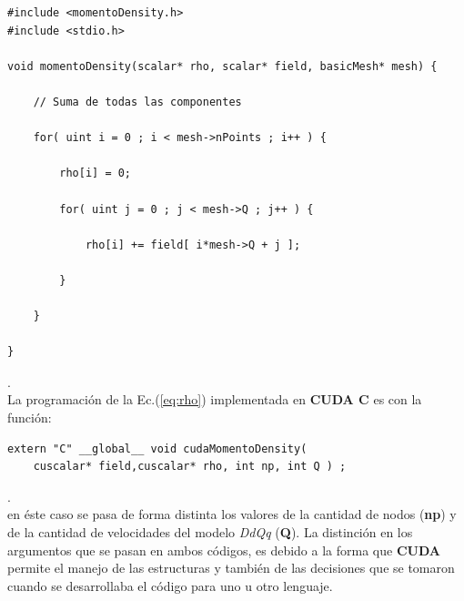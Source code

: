{\footnotesize
	\begin{frame}{}
		\begin{lstlisting}[frame=single]
#include <momentoDensity.h>
#include <stdio.h>

void momentoDensity(scalar* rho, scalar* field, basicMesh* mesh) {
	
	// Suma de todas las componentes
	
	for( uint i = 0 ; i < mesh->nPoints ; i++ ) {
		
		rho[i] = 0;	    
		
		for( uint j = 0 ; j < mesh->Q ; j++ ) {
		
			rho[i] += field[ i*mesh->Q + j ];
		
		}	
			
	}
	
}
		\end{lstlisting}
		
	\end{frame}
}.
\\

La programación de la Ec.(\ref{eq:rho}) implementada en \textbf{CUDA C} es con la función:

{\footnotesize
	\begin{frame}{}
		\begin{lstlisting}
extern "C" __global__ void cudaMomentoDensity(
	cuscalar* field,cuscalar* rho, int np, int Q ) ; 
		\end{lstlisting}
		
	\end{frame}
}.
\\
en éste caso se pasa de forma distinta los valores de la cantidad de nodos (\textbf{np}) y de la cantidad de velocidades del modelo \textit{DdQq} (\textbf{Q}). La distinción en los argumentos que se pasan en ambos códigos, es debido a la forma que \textbf{CUDA} permite el manejo de las estructuras y también de las decisiones que se tomaron cuando se desarrollaba el código para uno u otro lenguaje.

